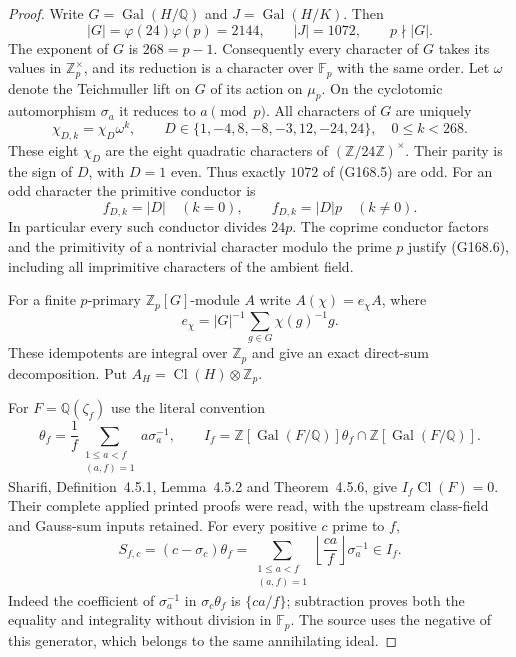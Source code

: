 \begin{proof}
Write $G=\operatorname{Gal}(H/\mathbb Q)$ and
$J=\operatorname{Gal}(H/K)$.
Then
\[
 |G|=\varphi(24)\varphi(p)=2144,
       \qquad |J|=1072,
       \qquad p\nmid |G|.
 \tag{G168.4}
\]
The exponent of $G$ is $268=p-1$.
Consequently every character of $G$ takes its values in
$\mathbb Z_p^\times$, and its reduction is a character over
$\mathbb F_p$ with the same order.
Let $\omega$ denote the Teichmuller lift on $G$ of its action
on $\mu_p$.  On the cyclotomic automorphism $\sigma_a$ it
reduces to $a\pmod p$.
All characters of $G$ are uniquely
\[
 \chi_{D,k}=\chi_D\omega^k,\qquad
 D\in\{1,-4,8,-8,-3,12,-24,24\},\quad0\leq k<268.
 \tag{G168.5}
\]
These eight $\chi_D$ are the eight quadratic characters of
$(\mathbb Z/24\mathbb Z)^\times$.
Their parity is the sign of $D$, with $D=1$ even.
Thus exactly $1072$ of (G168.5) are odd.
For an odd character the primitive conductor is
\[
          f_{D,k}=|D|\quad(k=0),\qquad
          f_{D,k}=|D|p\quad(k\ne0).
 \tag{G168.6}
\]
In particular every such conductor divides $24p$.
The coprime conductor factors and the primitivity of a nontrivial
character modulo the prime $p$ justify (G168.6), including
all imprimitive characters of the ambient field.

For a finite $p$-primary $\mathbb Z_p[G]$-module $A$ write
$A(\chi)=e_\chi A$, where
\[
                  e_\chi=|G|^{-1}\sum_{g\in G}\chi(g)^{-1}g.
 \tag{G168.7}
\]
These idempotents are integral over $\mathbb Z_p$ and give an
exact direct-sum decomposition.
Put $A_H=\operatorname{Cl}(H)\otimes\mathbb Z_p$.

For $F=\mathbb Q(\zeta_f)$ use the literal convention
\[
 \theta_f=\frac1f\sum_{\substack{1\leq a<f\\(a,f)=1}}
                a\sigma_a^{-1},\qquad
 I_f=\mathbb Z[\operatorname{Gal}(F/\mathbb Q)]\theta_f
                        \cap\mathbb Z[\operatorname{Gal}(F/\mathbb Q)].
 \tag{G168.8}
\]
Sharifi, Definition~4.5.1, Lemma~4.5.2 and Theorem~4.5.6,
give $I_f\operatorname{Cl}(F)=0$.
Their complete applied printed proofs were read, with the
upstream class-field and Gauss-sum inputs retained.
For every positive $c$ prime to $f$,
\[
 S_{f,c}=(c-\sigma_c)\theta_f
      =\sum_{\substack{1\leq a<f\\(a,f)=1}}
          \left\lfloor\frac{ca}{f}\right\rfloor\sigma_a^{-1}
                 \in I_f.
 \tag{G168.9}
\]
Indeed the coefficient of $\sigma_a^{-1}$ in
$\sigma_c\theta_f$ is $\{ca/f\}$; subtraction proves both
the equality and integrality without division in $\mathbb F_p$.
The source uses the negative of this generator, which belongs
to the same annihilating ideal.


\end{proof}
